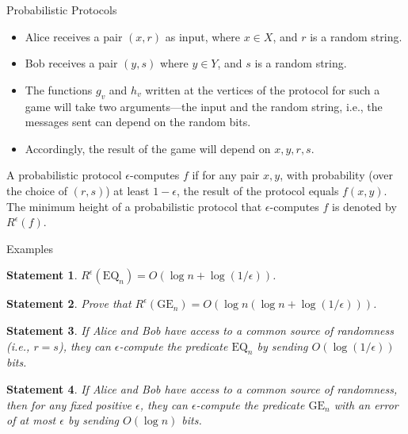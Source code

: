 \documentclass[
aspectratio=169]{beamer}
\newcommand{\pitem}{\pause\item}
\newtheorem{statement}{Statement}
\begin{document}
\begin{frame}{Probabilistic Protocols}
    \begin{itemize}
    \item Alice receives a pair $(x,r)$ as input, where $x \in X$, and $r$ is a random string.
    \pitem Bob receives a pair $(y,s)$ where $y \in Y$, and $s$ is a random string.
    \pitem The functions $g_v$ and $h_v$ written at the vertices of the protocol for such a game will take two arguments—the input and the random string, i.e., the messages sent can depend on the random bits.

    \pitem Accordingly, the result of the game will depend on $x,y,r,s$.
    \end{itemize}

    \pause
    \begin{definition}
        A probabilistic protocol $\epsilon$-computes $f$ if for any pair $x,y$, with probability (over the choice of $(r,s)$) at least $1 - \epsilon$, the result of the protocol equals $f(x,y)$. The minimum height of a probabilistic protocol that $\epsilon$-computes $f$ is denoted by $R^\epsilon(f)$.
    \end{definition}

\end{frame}

\begin{frame}{Examples}
    \begin{statement}
        $R^\epsilon(\mathrm{EQ}_n) = O(\log n + \log(1/\epsilon))$.
    \end{statement}

    \pause
    \begin{statement}
        Prove that $R^\epsilon(\mathrm{GE}_n) = O(\log n(\log n + \log(1/\epsilon)))$.
    \end{statement}

    \pause
    \begin{statement}
        If Alice and Bob have access to a common source of randomness (i.e., $r = s$), they can $\epsilon$-compute the predicate $\mathrm{EQ}_n$ by sending $O(\log(1/\epsilon))$ bits.
    \end{statement}

    \pause
    \begin{statement}
        If Alice and Bob have access to a common source of randomness, then for any fixed positive $\epsilon$, they can $\epsilon$-compute the predicate $\mathrm{GE}_n$ with an error of at most $\epsilon$ by sending $O(\log n)$ bits.
    \end{statement}
\end{frame}
\end{document}
